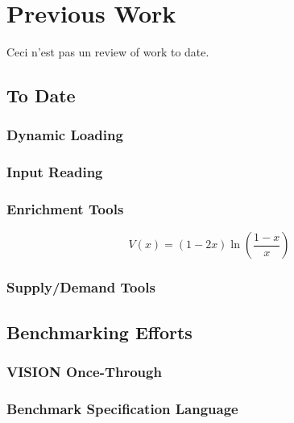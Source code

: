 \chapter{Previous Work}\label{ch:prevwork}

Ceci n'est pas un review of work to date. 

\section{\Cyclus To Date}

\subsection{Dynamic Loading}
\subsection{Input Reading}
\subsection{Enrichment Tools}\label{sec:prev-enrich}


\begin{equation}\label{eqs:enr-value}
  V(x) = (1 - 2x) \ln \left( \frac{1-x}{x} \right)
\end{equation}


\subsection{Supply/Demand Tools}
\subsection{\Cyclopts}

\section{Benchmarking Efforts}

\subsection{VISION Once-Through}
\subsection{Benchmark Specification Language}